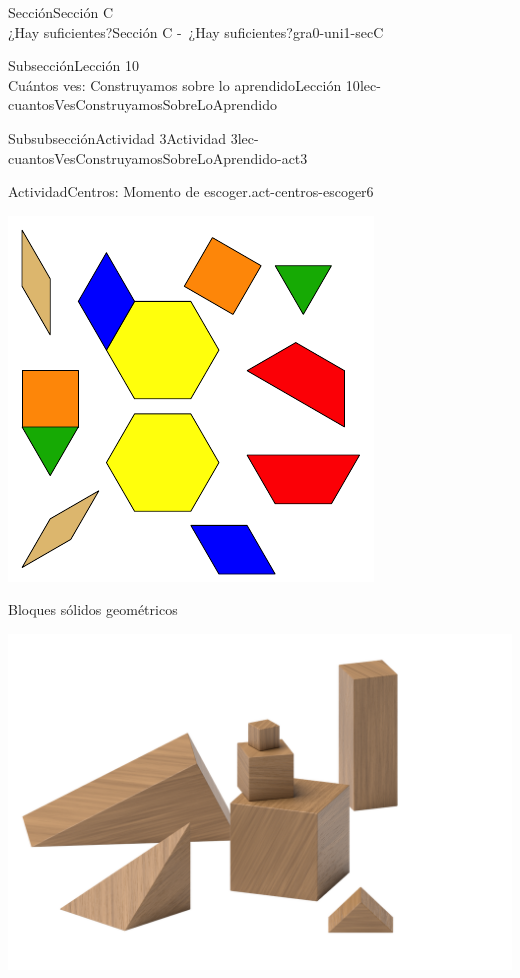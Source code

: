 \begin{sectionptx}{Sección}{{\Large Sección C\\}¿Hay suficientes?}{}{Sección C -~¿Hay suficientes?}{}{}{gra0-uni1-secC}
\begin{subsectionptx}{Subsección}{{\normalsize Lección 10\\[-0.05cm]}Cuántos ves: Construyamos sobre lo aprendido}{}{Lección 10}{}{}{lec-cuantosVesConstruyamosSobreLoAprendido}
\begin{subsubsectionptx}{Subsubsección}{Actividad 3}{}{Actividad 3}{}{}{lec-cuantosVesConstruyamosSobreLoAprendido-act3}
\begin{activity}{Actividad}{Centros: Momento de escoger.}{act-centros-escoger6}
\begin{sidebyside}{2}{0.025}{0.025}{0.05}
\begin{sbspanel}{0.45}
\includegraphics[max width=\linewidth, center]{external/svg-source/tikz-file-147344.pdf}
\end{sbspanel}%
\end{sidebyside}%
\begin{sidebyside}{2}{0.025}{0.025}{0.05}%
\begin{sbspanel}{0.45}%
Bloques sólidos geométricos%
\par
\includegraphics[max width=\linewidth, center]{external/png-source/K.1.A Beta Student Workbook.Geoblocks.png}
\end{sbspanel}%

\end{sidebyside}
\end{activity}
\end{subsubsectionptx}
\end{subsectionptx}
\end{sectionptx}
